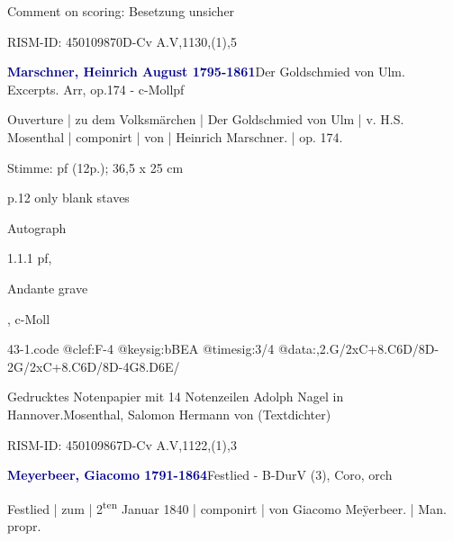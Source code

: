 \documentclass[a4paper, twocolumn, 11pt]{book}
\begin{document}
\par Comment on scoring: Besetzung unsicher
\par RISM-ID: 450109870\newline D-Cv  A.V,1130,(1),5
\par \vspace{16pt} \textcolor{darkblue}{\textbf{Marschner, Heinrich August  1795-1861}}\hfillplus{[43]}\newline Der Goldschmied von Ulm. Excerpts. Arr, op.174 - c-Moll\newline pf
\par \begin{itshape} Ouverture | zu dem Volksmärchen | Der Goldschmied von Ulm | v. H.S. Mosenthal | componirt | von | Heinrich Marschner. | op. 174.\end{itshape} 
\par \textcolor{darkblue}{}  Stimme: pf  (12p.); 36,5 x 25 cm\newline \begin{small} p.12 only blank staves\end{small} \newline Autograph
\par 1.1.1  pf, \begin{itshape}Andante grave\end{itshape}, c-Moll  
\begin{filecontents*}{43-1.code}
@clef:F-4
@keysig:bBEA
@timesig:3/4
@data:,2.G/2xC+{8.C6D}/8D-2G/2xC+{8.C6D}/8D-4G{8.D6E}/
\end{filecontents*}
\newline %
\par Gedrucktes Notenpapier mit 14 Notenzeilen {\textquotedbl}Adolph Nagel in Hannover.{\textquotedbl}\newline Mosenthal, Salomon Hermann von  (Textdichter)
\par RISM-ID: 450109867\newline D-Cv  A.V,1122,(1),3
\par \vspace{16pt} \textcolor{darkblue}{\textbf{Meyerbeer, Giacomo  1791-1864}}\hfillplus{[44]}\newline Festlied - B-Dur\newline V (3), Coro, orch
\par \begin{itshape} Festlied | zum | 2\textsuperscript{t}\textsuperscript{e}\textsuperscript{n} Januar 1840 | componirt | von Giacomo Meÿerbeer. | Man. propr.\end{itshape} 
\end{document}
